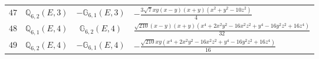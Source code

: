 \documentclass[fleqn,8pt,landscape]{jsarticle}
\begin{document}
\begin{table}[ht!]
\begin{center}
\begin{tabular}{cccl}
$ 47 $ & $ \mathbb{Q}_{6,2}(E,3) $ & $ -\mathbb{G}_{6,1}(E,3) $ & $ - \frac{3 \sqrt{7} x y \left(x - y\right) \left(x + y\right) \left(x^{2} + y^{2} - 10 z^{2}\right)}{4} $ \\
$ 48 $ & $ \mathbb{Q}_{6,1}(E,4) $ & $ \mathbb{G}_{6,2}(E,4) $ & $ \frac{\sqrt{210} \left(x - y\right) \left(x + y\right) \left(x^{4} + 2 x^{2} y^{2} - 16 x^{2} z^{2} + y^{4} - 16 y^{2} z^{2} + 16 z^{4}\right)}{32} $ \\
$ 49 $ & $ \mathbb{Q}_{6,2}(E,4) $ & $ -\mathbb{G}_{6,1}(E,4) $ & $ - \frac{\sqrt{210} x y \left(x^{4} + 2 x^{2} y^{2} - 16 x^{2} z^{2} + y^{4} - 16 y^{2} z^{2} + 16 z^{4}\right)}{16} $ \\
 \hline \hline
\end{tabular}
\end{center}
\end{table}
\end{document}
